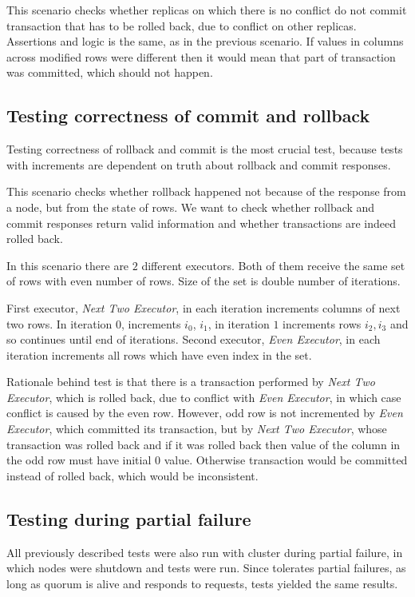 This scenario checks whether replicas on which there is no conflict do not commit transaction that has to be rolled back, due to conflict on other replicas. Assertions and logic is the same, as in the previous scenario. If values in columns across modified rows were different then it would mean that part of transaction was committed, which should not happen.

\subsection{Testing correctness of commit and rollback}
Testing correctness of rollback and commit is the most crucial test, because tests with increments are dependent on truth about rollback and commit responses. 

This scenario checks whether rollback happened not because of the response from a node, but from the state of rows. We want to check whether rollback and commit responses return valid information and whether transactions are indeed rolled back.

In this scenario there are $2$ different executors. Both of them receive the same set of rows with even number of rows. Size of the set is double number of iterations. 

First executor, \emph{Next Two Executor}, in each iteration increments columns of next two rows. In iteration $0$, increments $i_{0}$, $i_{1}$, in iteration $1$ increments rows $i_{2}, i_{3}$ and so continues until end of iterations. Second executor, \emph{Even Executor}, in each iteration increments all rows which have even index in the set.

Rationale behind test is that there is a transaction performed by \emph{Next Two Executor}, which is rolled back, due to conflict with \emph{Even Executor}, in which case conflict is caused by the even row. However, odd row is not incremented by \emph{Even Executor}, which committed its transaction, but by \emph{Next Two Executor}, whose transaction was rolled back and if it was rolled back then value of the column in the odd row must have initial $0$ value.  Otherwise transaction would be committed instead of rolled back, which would be inconsistent.


\subsection{Testing during partial failure}

All previously described tests were also run with cluster during partial failure, in which nodes were shutdown and tests were run. Since \mpt tolerates partial failures, as long as quorum is alive and responds to requests, tests yielded the same results.

